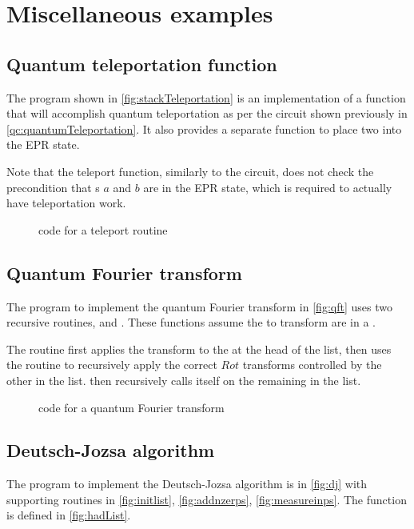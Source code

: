 \section{Miscellaneous examples}\label{sec:miscExamples}
\subsection{Quantum teleportation function}\label{subsubsec:quantumTeleportationExample}
The \lqpl{} program shown in \vref{fig:stackTeleportation}
 is an implementation of a function that will accomplish 
quantum teleportation as per the circuit shown previously in 
\vref{qc:quantumTeleportation}. It also provides a separate function
to place two \qbits{} into the EPR state.

Note that the teleport function, similarly to the circuit,
 does not check the precondition that \qbit{}s $a$ and $b$ are in the
EPR state, which is required to actually have teleportation work.

\begin{figure}[htbp]

\caption{\lqpl{} code for a teleport routine}\label{fig:stackTeleportation}
\end{figure}

\subsection{Quantum Fourier transform}
The \lqpl{} program to implement the quantum Fourier transform in 
\vref{fig:qft} uses
two recursive routines,  and . These
functions assume the \qbits{} to transform are in a .

The routine  first applies the \Had{} transform to the
\qbit{} at the head of the list, then uses the  routine
to recursively apply the correct $Rot$ transforms controlled by the
other \qbits{} in the list.  then recursively calls itself on
the remaining \qbits{} in the list.

\begin{figure}[htbp]

\caption{\lqpl{} code for a quantum Fourier transform}\label{fig:qft}
\end{figure}

\subsection{Deutsch-Jozsa algorithm}\label{appsubsec:djalgorithm}
The \lqpl{} program to implement the Deutsch-Jozsa algorithm is in 
\vref{fig:dj} with supporting routines in \ref{fig:initlist}, 
\ref{fig:addnzerps}, \ref{fig:measureinps}. The 
 function is defined in \vref{fig:hadList}.

